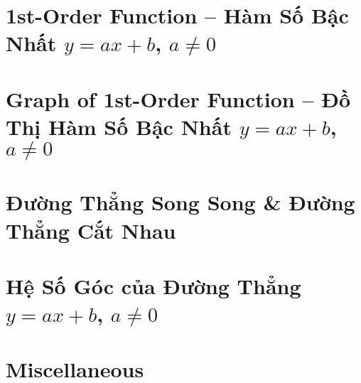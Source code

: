 \documentclass{article}
\begin{document}

\section{1st-Order Function -- Hàm Số Bậc Nhất $y = ax + b$, $a\ne0$}


\section{Graph of 1st-Order Function -- Đồ Thị Hàm Số Bậc Nhất $y = ax + b$, $a\ne0$}


\section{Đường Thẳng Song Song \& Đường Thẳng Cắt Nhau}


\section{Hệ Số Góc của Đường Thẳng $y = ax + b$, $a\ne0$}


\section{Miscellaneous}


\printbibliography[heading=bibintoc]
	
\end{document}
